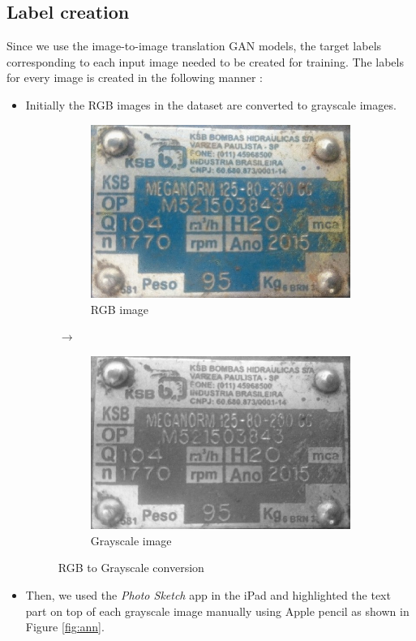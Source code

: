\subsection{Label creation}
Since we use the image-to-image translation GAN models, the target labels corresponding to each input image needed to be created for training. The labels for every image is created in the following manner :

\begin{itemize}

\item Initially the RGB images in the dataset are converted to grayscale images.

\begin{figure}[H]
\centering
\begin{subfigure}{.47\textwidth}
  \centering
  \includegraphics[width=.7\linewidth]{images/L1.jpg}
  \caption{RGB image}
\end{subfigure}%
{\LARGE$\xrightarrow{}$}%
\begin{subfigure}{.47\textwidth}
  \centering
  \includegraphics[width=.7\linewidth]{images/L2.jpg}
  \caption{Grayscale image}
\end{subfigure}
\caption{RGB to Grayscale conversion}
\end{figure}

\item Then, we used the \textit{Photo Sketch} app in the iPad and highlighted the text part on top of each grayscale image manually using Apple pencil as shown in Figure \ref{fig:ann}. 


\end{itemize}
